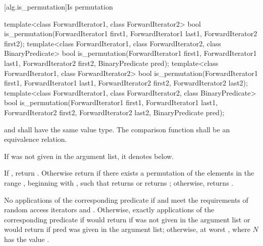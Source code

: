 [alg.is_permutation]{Is permutation}

%
\begin{itemdecl}
template<class ForwardIterator1, class ForwardIterator2>
  bool is_permutation(ForwardIterator1 first1, ForwardIterator1 last1,
                      ForwardIterator2 first2);
template<class ForwardIterator1, class ForwardIterator2,
                 class BinaryPredicate>
  bool is_permutation(ForwardIterator1 first1, ForwardIterator1 last1,
                      ForwardIterator2 first2, BinaryPredicate pred);
template<class ForwardIterator1, class ForwardIterator2>
  bool is_permutation(ForwardIterator1 first1, ForwardIterator1 last1,
                      ForwardIterator2 first2, ForwardIterator2 last2);
template<class ForwardIterator1, class ForwardIterator2,
                 class BinaryPredicate>
  bool is_permutation(ForwardIterator1 first1, ForwardIterator1 last1,
                      ForwardIterator2 first2, ForwardIterator2 last2,
                      BinaryPredicate pred);
\end{itemdecl}

\begin{itemdescr}
\pnum
\requires {} and  shall have the same
value type. The comparison function shall be an equivalence relation.

\pnum
\remarks If  was not given in the argument list, it denotes
 below.

\pnum
\returns If , return .
Otherwise return  if there exists a permutation of the elements in the
range , beginning with , such that  returns  or 
 returns ; otherwise, returns
.

\pnum
\complexity No applications of the corresponding predicate if 
and  meet the requirements of random access iterators and
.
Otherwise, exactly  applications of the
corresponding predicate if 
would return  if  was not given in the argument list
or  would return  if pred was given in the argument list; otherwise, at
worst , where $N$ has the value .
\end{itemdescr}

